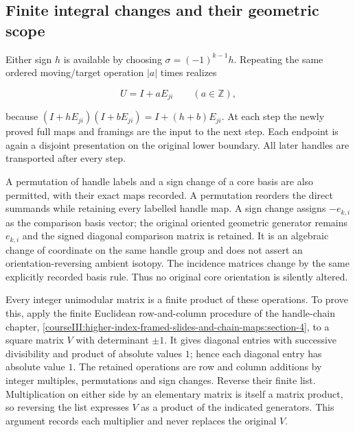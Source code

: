 \subsection{Finite integral changes and their geometric scope}
\label{courseIII:higher-index-framed-slides-and-chain-maps:higher-slide-integer-changes}

\label{courseIII:higher-index-framed-slides-and-chain-maps:section-6}\label{courseIII:higher-slides:6}

Either sign \(h\) is available by choosing \(\sigma=(-1)^{k-1}h\). Repeating the same ordered moving/target operation \(|a|\) times realizes

\begin{equation}
U=I+aE_{ji}\qquad(a\in\mathbb Z),
 \label{courseIII:higher-index-framed-slides-and-chain-maps:eq:6.1}
\end{equation}

because \((I+hE_{ji})(I+bE_{ji})=I+(h+b)E_{ji}\). At each step the newly proved full maps and framings are the input to the next step. Each endpoint is again a disjoint presentation on the original lower boundary. All later handles are transported after every step.

A permutation of handle labels and a sign change of a core basis are also permitted, with their exact maps recorded. A permutation reorders the direct summands while retaining every labelled handle map. A sign change assigns \(-e_{k,i}\) as the comparison basis vector; the original oriented geometric generator remains \(e_{k,i}\) and the signed diagonal comparison matrix is retained. It is an algebraic change of coordinate on the same handle group and does not assert an orientation-reversing ambient isotopy. The incidence matrices change by the same explicitly recorded basis rule. Thus no original core orientation is silently altered.

Every integer unimodular matrix is a finite product of these operations. To prove this, apply the finite Euclidean row-and-column procedure of the handle-chain chapter, \cref{courseIII:higher-index-framed-slides-and-chain-maps:section-4}, to a square matrix \(V\) with determinant \(\pm1\). It gives diagonal entries with successive divisibility and product of absolute values \(1\); hence each diagonal entry has absolute value \(1\). The retained operations are row and column additions by integer multiples, permutations and sign changes. Reverse their finite list. Multiplication on either side by an elementary matrix is itself a matrix product, so reversing the list expresses \(V\) as a product of the indicated generators. This argument records each multiplier and never replaces the original \(V\).

